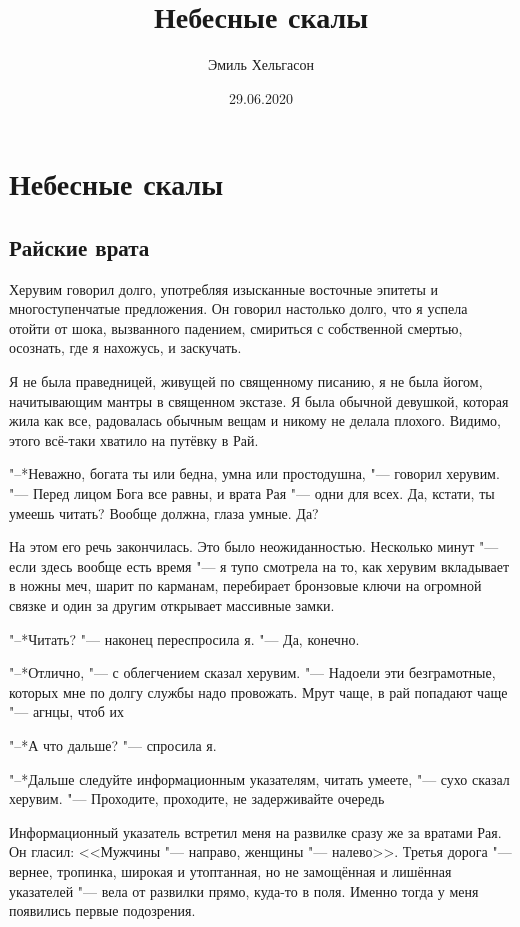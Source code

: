 \author{Эмиль Хельгасон}
\title{Небесные скалы}
\date{29.06.2020}
\maketitle

\tableofcontents

\chapter{Небесные скалы}

\section{Райские врата}

Херувим говорил долго, употребляя изысканные восточные эпитеты и многоступенчатые предложения.
Он говорил настолько долго, что я успела отойти от шока, вызванного падением, смириться с собственной смертью, осознать, где я нахожусь, и заскучать.

Я не была праведницей, живущей по священному писанию, я не была йогом, начитывающим мантры в священном экстазе.
Я была обычной девушкой, которая жила как все, радовалась обычным вещам и никому не делала плохого.
Видимо, этого всё-таки хватило на путёвку в Рай.

"--*Неважно, богата ты или бедна, умна или простодушна, "--- говорил херувим.
"--- Перед лицом Бога все равны, и врата Рая "--- одни для всех.
Да, кстати, ты умеешь читать?
Вообще должна, глаза умные.
Да?

На этом его речь закончилась.
Это было неожиданностью.
Несколько минут "--- если здесь вообще есть время "--- я тупо смотрела на то, как херувим вкладывает в ножны меч, шарит по карманам, перебирает бронзовые ключи на огромной связке и один за другим открывает массивные замки.

"--*Читать? "--- наконец переспросила я.
"--- Да, конечно.

"--*Отлично, "--- с облегчением сказал херувим.
"--- Надоели эти безграмотные, которых мне по долгу службы надо провожать.
Мрут чаще, в рай попадают чаще "--- агнцы, чтоб их\ldotst

"--*А что дальше? "--- спросила я.

"--*Дальше следуйте информационным указателям, читать умеете, "--- сухо сказал херувим.
"--- Проходите, проходите, не задерживайте очередь\ldotst

Информационный указатель встретил меня на развилке сразу же за вратами Рая.
Он гласил: <<Мужчины "--- направо, женщины "--- налево>>.
Третья дорога "--- вернее, тропинка, широкая и утоптанная, но не замощённая и лишённая указателей "--- вела от развилки прямо, куда-то в поля.
Именно тогда у меня появились первые подозрения.

